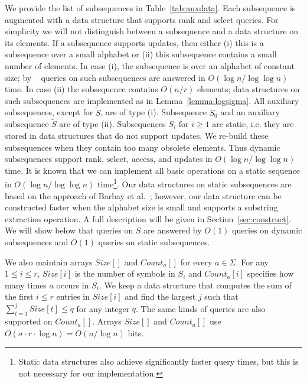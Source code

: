 \documentclass[11pt]{article}\usepackage{fullpage}
\def\idrm#1{\ensuremath{\mathrm{#1}}}
\newcommand{\tS}{{\tilde S}}
\newcommand{\ra}{\idrm{rank}}
\newcommand{\sel}{\idrm{select}}
\newcommand{\acc}{\idrm{access}}
\newcommand{\shlongver}[2]{#2}
\begin{document}
We provide the list of subsequences in Table~\ref{tab:auxdata}. Each subsequence is augmented with a data structure that supports rank and select queries.  
For simplicity we will not distinguish between a subsequence and a data structure on its elements. 
If a subsequence supports updates, then either (i) this is a subsequence over 
a small alphabet or (ii) this subsequence contains a small number of elements. 
In case (i), the subsequence is over an alphabet of constant size; by ~\cite{NS14,HM10} queries on such subsequences are answered in $O(\log n/\log \log n)$ time. In case (ii) the subsequence contains $O(n/r)$ elements; data structures on such subsequences are implemented as in Lemma~\ref{lemma:logsigma}. 
All auxiliary subsequences, except for $\tS$, are of type (i). Subsequence $S_0$ and an auxiliary subsequence $\tS$ are of type (ii). Subsequences $S_i$ for $i\ge 1$ are static, i.e. they are stored in data structures that do not support updates. We re-build these subsequences when they contain too many obsolete elements.  Thus dynamic subsequences support $\ra$, $\sel$, $\acc$, and updates in $O(\log n/\log\log n)$ time. It is known that we can implement all basic operations on a static sequence in $O(\log n/\log \log n)$ time\footnote{Static data structures also achieve significantly faster query times, but this is not necessary for our implementation.}. Our data structures on static subsequences are based on the approach of Barbay et al.~\cite{BHMR07}; however, our data structure can be constructed faster when the alphabet size is small and supports a substring extraction operation. A full description will be given in \shlongver{the full version of this paper}{Section~\ref{sec:construct}}. We will show below that queries on $S$ are answered by $O(1)$ queries on dynamic subsequences and $O(1)$ queries on static subsequences.

We also maintain arrays $Size[]$ and $Count_a[]$ for every $a\in \Sigma$. For any $1\le i \le r$, $Size[i]$ is the number of symbols in $S_i$ and $Count_a[i]$ specifies how many times $a$ occurs in $S_i$. We keep a data structure that computes  the sum of the first $i\le r$ entries in $Size[i]$ and find the largest $j$ such that $\sum_{t=1}^j Size[t]\le q$ for any integer $q$. The same kinds of queries are also supported on $Count_a[]$.  Arrays $Size[ ]$ and 
$Count_a[]$ use $O(\sigma\cdot r \cdot \log n)=O(n/\log n)$ bits. 
\end{document}
